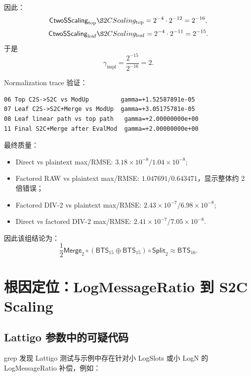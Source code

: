 \documentclass[UTF8,a4paper,11pt]{ctexart}
\newcommand{\Split}{\mathsf{Split}}
\newcommand{\Merge}{\mathsf{Merge}}
\newcommand{\BTS}{\mathsf{BTS}}
\newcommand{\CtwoSScaling}{\mathsf{CtwoSScaling}}
\begin{document}
因此：
\begin{equation}
\CtwoSScaling_{\mathrm{top}}\S2CScaling_{\mathrm{top}}
=2^{-4}\cdot2^{-12}=2^{-16},
\end{equation}
\begin{equation}
\CtwoSScaling_{\mathrm{leaf}}\S2CScaling_{\mathrm{leaf}}
=2^{-4}\cdot2^{-11}=2^{-15}.
\end{equation}
于是
\begin{equation}
\boxed{
\gamma_{\mathrm{impl}}
=
\frac{2^{-15}}{2^{-16}}=2.
}
\end{equation}

Normalization trace 验证：
\begin{lstlisting}[style=textstyle,caption={$\log N=16,k=2$ normalization trace 摘要}]
06 Top C2S->S2C vs ModUp         gamma=+1.52587891e-05
07 Leaf C2S->S2C+Merge vs ModUp  gamma=+3.05175781e-05
08 Leaf linear path vs top path   gamma=+2.00000000e+00
11 Final S2C+Merge after EvalMod  gamma=+2.00000000e+00
\end{lstlisting}

最终质量：
\begin{itemize}[leftmargin=2em]
\item Direct vs plaintext max/RMSE: $3.18\times10^{-8}/1.04\times10^{-8}$;
\item Factored RAW vs plaintext max/RMSE: $1.047691/0.643471$，显示整体约 $2$ 倍错误；
\item Factored DIV-2 vs plaintext max/RMSE: $2.43\times10^{-7}/6.98\times10^{-8}$;
\item Direct vs factored DIV-2 max/RMSE: $2.41\times10^{-7}/7.05\times10^{-8}$.
\end{itemize}

因此该组结论为：
\begin{equation}
\boxed{
\frac{1}{2}\Merge_2\circ(\BTS_{15}\oplus\BTS_{15})\circ\Split_2
\approx
\BTS_{16}.
}
\end{equation}

\section{根因定位：LogMessageRatio 到 S2C Scaling}

\subsection{Lattigo 参数中的可疑代码}

grep 发现 Lattigo 测试与示例中存在针对小 LogSlots 或小 LogN 的 LogMessageRatio 补偿，例如：
\end{document}
